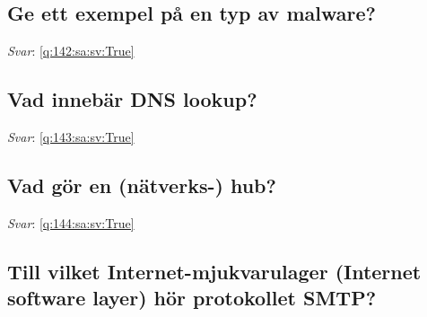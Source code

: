 \documentclass[a4paper,11pt,oneside]{article}
\begin{document}
\begin{sloppypar}
\subsection{Ge ett exempel p\r{a} en typ av malware?}

\label{q:142:sa:sv:False}

\vspace{2cm}

\noindent\makebox[\textwidth]{\hrulefill}

\vspace{1cm}

\textit{Svar}: \autoref{q:142:sa:sv:True}



\subsection{Vad inneb\"ar DNS lookup?}

\label{q:143:sa:sv:False}

\vspace{2cm}

\noindent\makebox[\textwidth]{\hrulefill}

\vspace{1cm}

\textit{Svar}: \autoref{q:143:sa:sv:True}



\subsection{Vad g\"or en (n\"atverks-) hub?}

\label{q:144:sa:sv:False}

\vspace{2cm}

\noindent\makebox[\textwidth]{\hrulefill}

\vspace{1cm}

\textit{Svar}: \autoref{q:144:sa:sv:True}



\subsection{Till vilket Internet-mjukvarulager (Internet software layer) h\"or protokollet SMTP?}

\label{q:145:sa:sv:False}

\vspace{2cm}

\noindent\makebox[\textwidth]{\hrulefill}


\end{sloppypar}
\end{document}
